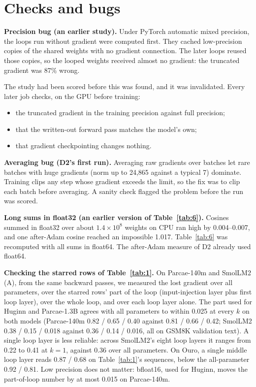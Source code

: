 \documentclass[10pt]{article}
\begin{document}
\section{Checks and bugs}\label{app:F}

\textbf{Precision bug (an earlier study).} Under PyTorch automatic mixed precision, the loops run without gradient were computed first. They cached low-precision copies of the shared weights with no gradient connection. The later loops reused those copies, so the looped weights received almost no gradient: the truncated gradient was 87\% wrong.

The study had been scored before this was found, and it was invalidated. Every later job checks, on the GPU before training:

\begin{itemize}
\item the truncated gradient in the training precision against full precision;
\item that the written-out forward pass matches the model's own;
\item that gradient checkpointing changes nothing.
\end{itemize}

\textbf{Averaging bug (D2's first run).} Averaging raw gradients over batches let rare batches with huge gradients (norm up to 24,865 against a typical 7) dominate. Training clips any step whose gradient exceeds the limit, so the fix was to clip each batch before averaging. A sanity check flagged the problem before the run was scored.

\textbf{Long sums in float32 (an earlier version of Table~\ref{tab:6}).} Cosines summed in float32 over about $1.4\times 10^{8}$ weights on CPU ran high by 0.004--0.007, and one after-Adam cosine reached an impossible 1.017. Table~\ref{tab:6} was recomputed with all sums in float64. The after-Adam measure of D2 already used float64.

\textbf{Checking the starred rows of Table~\ref{tab:1}.} On Parcae-140m and SmolLM2 (A), from the same backward passes, we measured the lost gradient over all parameters, over the starred rows' part of the loop (input-injection layer plus first loop layer), over the whole loop, and over each loop layer alone. The part used for Huginn and Parcae-1.3B agrees with all parameters to within 0.025 at every $k$ on both models (Parcae-140m 0.82 / 0.65 / 0.40 against 0.81 / 0.66 / 0.42; SmolLM2 0.38 / 0.15 / 0.018 against 0.36 / 0.14 / 0.016, all on GSM8K validation text). A single loop layer is less reliable: across SmolLM2's eight loop layers it ranges from 0.22 to 0.41 at $k = 1$, against 0.36 over all parameters. On Ouro, a single middle loop layer reads 0.87 / 0.68 on Table~\ref{tab:1}'s sequences, below the all-parameter 0.92 / 0.81. Low precision does not matter: bfloat16, used for Huginn, moves the part-of-loop number by at most 0.015 on Parcae-140m.
\end{document}
